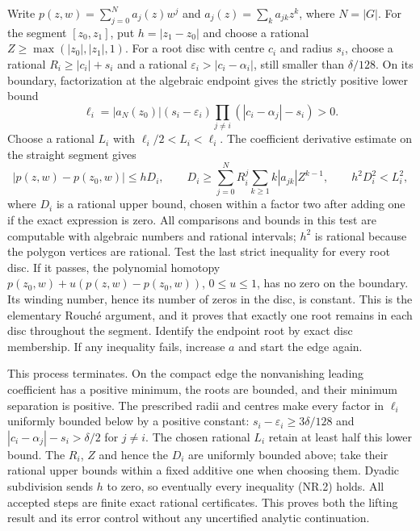 Write $p(z,w)=\sum_{j=0}^N a_j(z)w^j$ and
$a_j(z)=\sum_k a_{jk}z^k$, where $N=|G|$.
For the segment $[z_0,z_1]$, put $h=|z_1-z_0|$ and choose a rational
$Z\ge\max(|z_0|,|z_1|,1)$.  For a root disc with centre $c_i$ and
radius $s_i$, choose a rational $R_i\ge|c_i|+s_i$ and a rational
$\varepsilon_i>|c_i-\alpha_i|$, still smaller than $\delta/128$.
On its boundary, factorization at the algebraic endpoint gives the
strictly positive lower bound
\[
 \ell_i=|a_N(z_0)|(s_i-\varepsilon_i)
               \prod_{j\ne i}(|c_i-\alpha_j|-s_i)>0.
\]
Choose a rational $L_i$ with $\ell_i/2<L_i<\ell_i$.
The coefficient derivative estimate on the straight segment gives
\[
 |p(z,w)-p(z_0,w)|\le h D_i,\qquad
 D_i\ge\sum_{j=0}^N R_i^j\sum_{k\ge1}k|a_{jk}|Z^{k-1},
 \qquad h^2D_i^2<L_i^2,                                    \tag{NR.2}
\]
where $D_i$ is a rational upper bound, chosen within a factor two after
adding one if the exact expression is zero.  All comparisons and bounds
in this test are computable with algebraic numbers and rational intervals;
$h^2$ is rational because the polygon vertices are rational.  Test the
last strict inequality for every root disc.  If it passes, the polynomial
homotopy $p(z_0,w)+u(p(z,w)-p(z_0,w))$, $0\le u\le1$, has no zero
on the boundary.  Its winding number, hence its number of zeros in the
disc, is constant.  This is the elementary Rouch\'e argument, and it proves
that exactly one root remains in each disc throughout the segment.
Identify the endpoint root by exact disc membership.  If any inequality
fails, increase $a$ and start the edge again.

This process terminates.  On the compact edge the nonvanishing leading
coefficient has a positive minimum, the roots are bounded, and their
minimum separation is positive.  The prescribed radii and centres make
every factor in $\ell_i$ uniformly bounded below by a positive constant:
$s_i-\varepsilon_i\ge3\delta/128$ and
$|c_i-\alpha_j|-s_i>\delta/2$ for $j\ne i$.
The chosen rational $L_i$ retain at least half this lower bound.
The $R_i$, $Z$ and hence the $D_i$ are uniformly bounded above; take their
rational upper bounds within a fixed additive one when choosing them.
Dyadic subdivision sends $h$ to zero, so eventually every inequality
(NR.2) holds.  All accepted steps are finite exact rational certificates.
This proves both the lifting result and its error control without any
uncertified analytic continuation.

